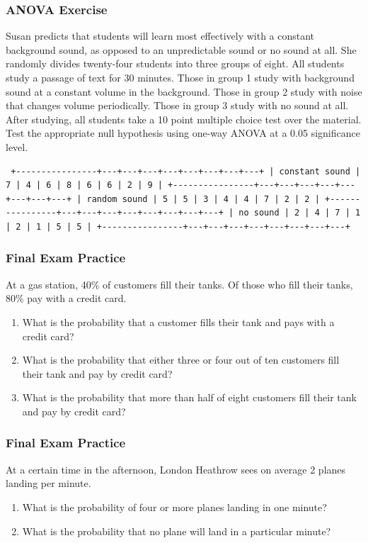\documentclass[xcolor=dvipsnames]{beamer} \usepackage{teachbeamer}
\begin{document}
\begin{frame}[fragile]
  \frametitle{ANOVA Exercise} Susan predicts that students will learn most effectively with a constant background sound, as opposed to an unpredictable sound or no sound at all. She randomly divides twenty-four students into three groups of eight. All students study a passage of text for 30 minutes. Those in group 1 study with background sound at a constant volume in the background. Those in group 2 study with noise that changes volume periodically. Those in group 3 study with no sound at all. After studying, all students take a 10 point multiple choice test over the material. Test the appropriate null hypothesis using one-way ANOVA at a 0.05 significance level.

\begin{footnotesize}
\begin{verbatim} +----------------+---+---+---+---+---+---+---+---+ | constant sound | 7 | 4 | 6 | 8 | 6 | 6 | 2 | 9 | +----------------+---+---+---+---+---+---+---+---+ | random sound | 5 | 5 | 3 | 4 | 4 | 7 | 2 | 2 | +----------------+---+---+---+---+---+---+---+---+ | no sound | 2 | 4 | 7 | 1 | 2 | 1 | 5 | 5 | +----------------+---+---+---+---+---+---+---+---+
\end{verbatim}
\end{footnotesize}
\end{frame}

\begin{frame}
  \frametitle{Final Exam Practice} {\ubung} At a gas station, 40\% of customers fill their tanks. Of those who fill their tanks, 80\% pay with a credit card.
  \begin{enumerate}
  \item What is the probability that a customer fills their tank and pays with a credit card?
  \item What is the probability that either three or four out of ten customers fill their tank and pay by credit card?
  \item What is the probability that more than half of eight customers fill their tank and pay by credit card?
  \end{enumerate}
\end{frame}

\begin{frame}
  \frametitle{Final Exam Practice} {\ubung} At a certain time in the afternoon, London Heathrow sees on average 2 planes landing per minute.
  \begin{enumerate}
  \item What is the probability of four or more planes landing in one minute?
  \item What is the probability that no plane will land in a particular minute?
  \end{enumerate}
\end{frame}
\end{document}
